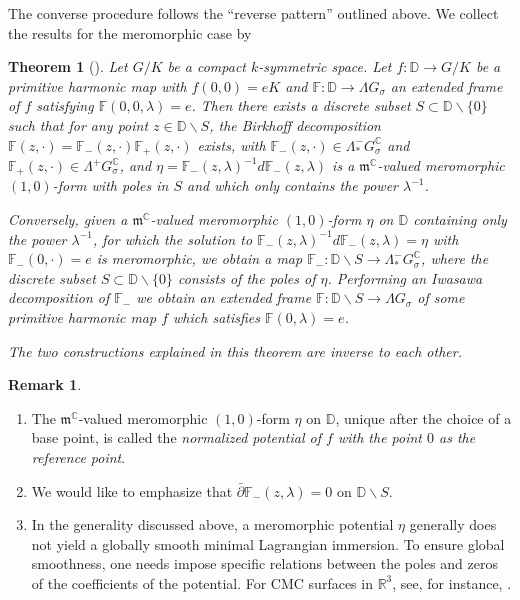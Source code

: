\documentclass[a4paper,11pt]{amsart}
\newtheorem{theorem}{Theorem}[section]
\theoremstyle{definition}
\newtheorem{remark}{Remark}
\numberwithin{equation}{section}
\newcommand{\R}{\mathbb{R}}
\newcommand{\D}{\mathbb{D}}
\newcommand{\F}{\mathbb{F}}
\begin{document}
The converse procedure follows the ``reverse pattern'' outlined above.
We collect the results for the meromorphic case by

\begin{theorem}[\cite{DPW}] Let $G/K$ be a compact $k$-symmetric space.
Let $f: \D\rightarrow G/K$ be a primitive harmonic map with $f(0, 0)=eK$ and $\F: \D \rightarrow \Lambda G_{\sigma}$  an extended frame of $f$ satisfying $\F(0, 0, \lambda) = e$. 
Then there exists a discrete subset $S\subset \D\backslash \{0\}$ such that for any point $z\in \D\backslash S$, the Birkhoff decomposition 
$\F(z,\cdot)=\F_{-}(z,\cdot) \F_{+}(z,\cdot)$ exists, with 
$\F_{-}(z,\cdot)\in \Lambda^{-}_{*}G_{\sigma}^{\mathbb{C}}$ and 
$\F_{+}(z,\cdot)\in \Lambda^{+}G_{\sigma}^{\mathbb{C}}$, and 
$\eta= \F_{-}(z,\lambda)^{-1}d\F_{-}(z,\lambda)$ is a $\mathfrak{m}^{\mathbb C}$-valued meromorphic $(1,0)$-form with poles in $S$ and which only contains the power $\lambda^{-1}$.

 Conversely, given a  $\mathfrak{m}^{\mathbb C}$-valued meromorphic $(1,0)$-form $\eta$ on $\D$ containing only the power $\lambda^{-1}$, for which the solution to $\F_{-}(z,\lambda)^{-1}d\F_{-}(z,\lambda)= \eta$ with $\F_{-}(0,\cdot)=e$ is meromorphic, we obtain a map  $\F_{-}:\D\backslash S \rightarrow \Lambda_{*}^{-} G_{\sigma}^{\mathbb C}$, where the discrete subset $S\subset \D\backslash\{0\}$ consists of the poles of $\eta$.
Performing an Iwasawa decomposition of $\F_-$ we obtain an extended frame $\F: \D\backslash S\rightarrow \Lambda G_{\sigma}$ of some  primitive harmonic map $f$  which satisfies $\F(0,\lambda) = e$. 

The two constructions explained in this theorem are inverse to each other. 
\end{theorem}

\begin{remark} \begin{enumerate}
\item The  $\mathfrak{m}^{\mathbb C}$-valued meromorphic $(1,0)$-form $\eta$  on $\D$,  unique after the choice of a base point, 
is called the {\it normalized potential of $f$ with the point $0$ as the reference point}. 

\item  We would like to emphasize  that $\bar\partial \F_{-}(z,\lambda)=0$ on $\D\backslash S$.  
 
\item  In the generality discussed above, a meromorphic potential $\eta$ generally does not yield a globally smooth minimal Lagrangian immersion.  To ensure global smoothness, one needs impose specific relations between the poles and zeros of the coefficients of the potential. For CMC surfaces in $\R^3$, see, for instance, \cite{DoHaMero}.

\end{enumerate}
\end{remark}
\end{document}
